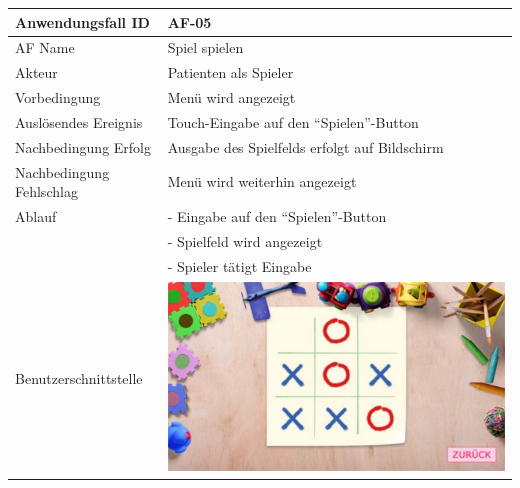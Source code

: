 \documentclass[12pt]{article}
\begin{document}
\begin{tabularx}{\textwidth}{|l|X|} \hline
Anwendungsfall ID&AF-05\\ \hline
AF Name&Spiel spielen\\ \hline
Akteur&Patienten als Spieler\\ \hline
Vorbedingung&Menü wird angezeigt\\ \hline
Auslösendes Ereignis&Touch-Eingabe auf den "`Spielen"'-\Gls{Button}\\ \hline
Nachbedingung Erfolg&Ausgabe des Spielfelds erfolgt auf Bildschirm\\ \hline
Nachbedingung Fehlschlag&Menü wird weiterhin angezeigt\\ \hline
Ablauf&- Eingabe auf den "`Spielen"'-\Gls{Button}\\&- Spielfeld wird angezeigt\\&- Spieler tätigt Eingabe\\ \hline
Benutzerschnittstelle&\includegraphics[scale=0.33]{Spielen.pdf}\\ \hline
\end{tabularx}\\
\end{document}

